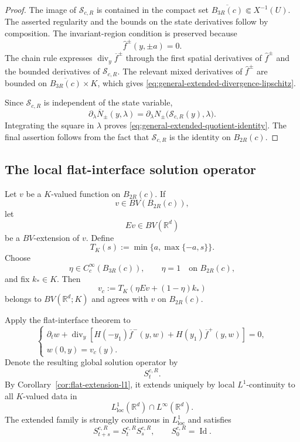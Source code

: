 \documentclass[11pt]{amsart}
\numberwithin{equation}{section}
\theoremstyle{plain}
\theoremstyle{definition}
\theoremstyle{remark}
\begin{document}
\begin{proof}
The image of \(\mathcal S_{c,R}\) is contained in the compact set
\(\overline{B_{3R}(c)}\Subset X^{-1}(U)\). The asserted regularity and the
bounds on the state derivatives follow by composition. The invariant-region
condition is preserved because
\[
    \widehat f^\pm(y,\pm a)=0.
\]
The chain rule expresses
\(\operatorname{div}_y\overline f^\pm\) through the first spatial
derivatives of \(\widehat f^\pm\) and the bounded derivatives of
\(\mathcal S_{c,R}\). The relevant mixed derivatives of
\(\widehat f^\pm\) are bounded on \(\overline{B_{3R}(c)}\times K\), which
gives \eqref{eq:general-extended-divergence-lipschitz}.

Since \(\mathcal S_{c,R}\) is independent of the state variable,
\[
    \partial_\lambda\overline N_\pm(y,\lambda)
    =
    \partial_\lambda N_\pm
    \bigl(\mathcal S_{c,R}(y),\lambda\bigr).
\]
Integrating the square in \(\lambda\) proves
\eqref{eq:general-extended-quotient-identity}. The final assertion follows
from the fact that \(\mathcal S_{c,R}\) is the identity on \(B_{2R}(c)\).
\end{proof}

\subsection{The local flat-interface solution operator}
\label{subsec:general-local-semigroup}

Let \(v\) be a \(K\)-valued function on \(B_{2R}(c)\). If
\[
    v\in BV(B_{2R}(c)),
\]
let
\[
    Ev\in BV(\mathbb R^d)
\]
be a \(BV\)-extension of \(v\). Define
\[
    T_K(s):=\min\{a,\max\{-a,s\}\}.
\]
Choose
\[
    \eta\in C_c^\infty(B_{3R}(c)),
    \qquad
    \eta=1
    \quad\text{on }B_{2R}(c),
\]
and fix \(k_*\in K\). Then
\begin{equation}
\label{eq:general-bv-extension}
    v_c
    :=
    T_K\left(
        \eta Ev+(1-\eta)k_*
    \right)
\end{equation}
belongs to \(BV(\mathbb R^d;K)\) and agrees with \(v\) on \(B_{2R}(c)\).

Apply the flat-interface theorem to
\begin{equation}
\label{eq:general-extended-flat-problem}
\begin{cases}
\partial_t w
+
\operatorname{div}_y
\left[
    H(-y_1)\overline f^-(y,w)
    +
    H(y_1)\overline f^+(y,w)
\right]
=0,
\\[1mm]
w(0,y)=v_c(y).
\end{cases}
\end{equation}
Denote the resulting global solution operator by
\[
    S_t^{c,R}.
\]
By Corollary~\ref{cor:flat-extension-l1}, it extends uniquely by local
\(L^1\)-continuity to all \(K\)-valued data in
\[
    L^1_{\mathrm{loc}}(\mathbb R^d)
    \cap
    L^\infty(\mathbb R^d).
\]
The extended family is strongly continuous in
\(L^1_{\mathrm{loc}}\) and satisfies
\begin{equation}
\label{eq:general-flat-semigroup-property}
    S_{t+s}^{c,R}
    =
    S_t^{c,R}S_s^{c,R},
    \qquad
    S_0^{c,R}=\operatorname{Id}.
\end{equation}
\end{document}
